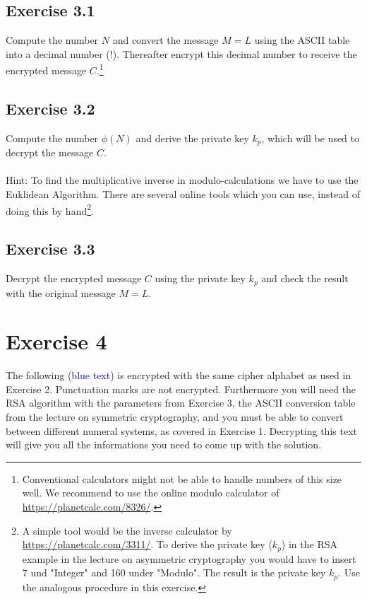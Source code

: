 \documentclass[12pt]{article}
\begin{document}
	\subsection*{Exercise 3.1}
	
	Compute the number $N$ and convert the message $M = L$ using the ASCII table into a decimal number (!). Thereafter encrypt this decimal number to receive the encrypted message $C$.\footnote{Conventional calculators might not be able to handle numbers of this size well. We recommend to use the online modulo calculator of \href{https://planetcalc.com/8326/}{https://planetcalc.com/8326/}.}
	
	\subsection*{Exercise 3.2}
	
	Compute the number $\phi(N)$ and derive the private key $k_{p}$, which will be used to decrypt the message $C$. 
	\\
	\\
	Hint: To find the multiplicative inverse in modulo-calculations we have to use the Euklidean Algorithm. There are several online tools which you can use, instead of doing this by hand\footnote{A simple tool would be the inverse calculator by \href{https://planetcalc.com/3311/}{https://planetcalc.com/3311/}. To derive the private key ($k_p$) in the RSA example in the lecture on asymmetric cryptography you would have to insert 7 und "Integer" and 160 under "Modulo". The result is the private key $k_{p}$. Use the analogous procedure in this exercise.}.
	
	\subsection*{Exercise 3.3}
	
	Decrypt the encrypted message $C$ using the private key $k_{p}$ and check the result with the original message $M = L$.	
	

	\newpage

	\section*{Exercise 4}

The following (\textcolor{blue}{blue text}) is encrypted with the same cipher alphabet as used in Exercise 2. Punctuation marks are not encrypted. Furthermore you will need the RSA algorithm with the parameters from Exercise 3, the ASCII conversion table from the lecture on symmetric cryptography, and you must be able to convert between different numeral systems, as covered in Exercise 1. Decrypting this text will give you all the informations you need to come up with the solution.\\
	
\end{document}
